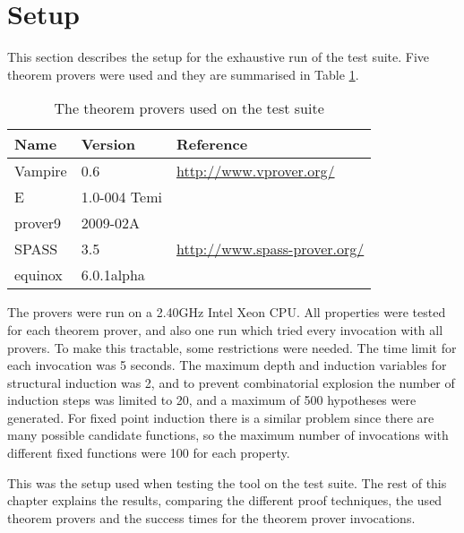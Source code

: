 \section{Setup}

This section describes the setup for the exhaustive run of the test
suite. Five theorem provers were used and they are summarised in Table
\ref{tbl:provers}.

\begin{table}[h]
  \centering
  \begin{tabular}{l | l | l}
    Name    & Version      & Reference \\
    \hline
    Vampire & 0.6          & \url{http://www.vprover.org/}                                \\
    E       & 1.0-004 Temi & \cite{schulzE} \\ %
    prover9 & 2009-02A     & \cite{prover9}                                              \\
    SPASS   & 3.5          & \url{http://www.spass-prover.org/}                           \\
    equinox & 6.0.1alpha   & \cite{equinoxCADE} \\ %
  \end{tabular}
  \caption{The theorem provers used on the test suite
    \label{tbl:provers}
  }
\end{table}

The provers were run on a 2.40GHz Intel Xeon CPU. All properties were
tested for each theorem prover, and also one run which tried every
invocation with all provers. To make this tractable, some restrictions
were needed. The time limit for each invocation was 5 seconds. The
maximum depth and induction variables for structural induction was 2,
and to prevent combinatorial explosion the number of induction steps
was limited to 20, and a maximum of 500 hypotheses were generated. For
fixed point induction there is a similar problem since there are many
possible candidate functions, so the maximum number of invocations
with different fixed functions were 100 for each property.

This was the setup used when testing the tool on the test suite. The
rest of this chapter explains the results, comparing the different
proof techniques, the used theorem provers and the success times for
the theorem prover invocations.

